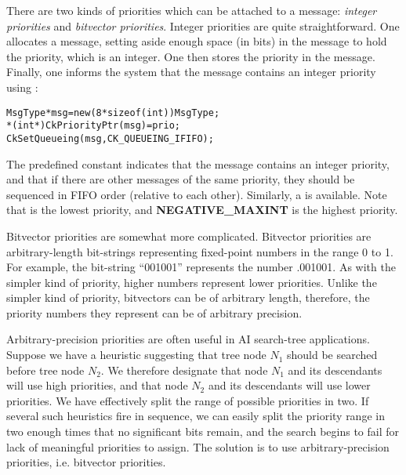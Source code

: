 
There are two kinds of priorities which can be attached to a message:
{\sl integer priorities} and {\sl bitvector
priorities}.  Integer priorities are quite
straightforward.  One allocates a message, setting aside enough space
(in bits) in the message to hold the priority, which is an integer.
One then stores the priority in the message.  Finally, one informs the
system that the message contains an integer priority using
:

\begin{alltt}
  MsgType *msg = new (8*sizeof(int)) MsgType;
  *(int*)CkPriorityPtr(msg) = prio;
  CkSetQueueing(msg, CK_QUEUEING_IFIFO);
\end{alltt}

The predefined constant   indicates that the
message contains an integer priority, and that if there are other
messages of the same priority, they should be sequenced in FIFO order
(relative to each other).  Similarly, a   is
available.  Note that   is the lowest priority, and {\bf
NEGATIVE\_MAXINT} is the highest priority.

Bitvector priorities are somewhat more complicated.  Bitvector
priorities are arbitrary-length bit-strings representing fixed-point
numbers in the range 0 to 1.  For example, the bit-string ``001001''
represents the number .001001\raisebox{-.5ex}{\scriptsize binary}.  As
with the simpler kind of priority, higher numbers represent lower
priorities.  Unlike the simpler kind of priority, bitvectors can be of
arbitrary length, therefore, the priority numbers they represent can
be of arbitrary precision.

Arbitrary-precision priorities
are often useful in AI search-tree applications.  Suppose we have a
heuristic suggesting that tree node $N_1$ should be searched before
tree node $N_2$.  We therefore designate that node $N_1$ and its
descendants will use high priorities, and that node $N_2$ and its
descendants will use lower priorities.  We have effectively split the
range of possible priorities in two.  If several such heuristics fire
in sequence, we can easily split the priority range  in two enough times that no significant bits remain,
and the search begins to fail for lack of meaningful priorities to
assign.  The solution is to use arbitrary-precision priorities,
i.e. bitvector priorities.

